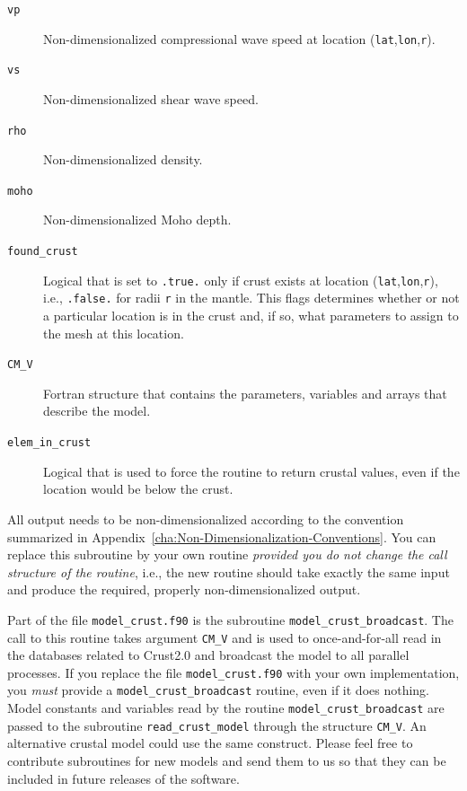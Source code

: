 \documentclass[oneside,english]{book}
\begin{document}
\begin{description}
\item [{\texttt{vp}}] Non-dimensionalized compressional wave speed at location
(\texttt{lat},\texttt{lon},\texttt{r}).
\item [{\texttt{vs}}] Non-dimensionalized shear wave speed.
\item [{\texttt{rho}}] Non-dimensionalized density.
\item [{\texttt{moho}}] Non-dimensionalized Moho depth.
\item [{\texttt{found\_crust}}] Logical that is set to \texttt{.true.}
only if crust exists at location (\texttt{lat},\texttt{lon},\texttt{r}),
i.e., \texttt{.false.} for radii \texttt{r} in the mantle. This flags
determines whether or not a particular location is in the crust and,
if so, what parameters to assign to the mesh at this location.
\item [{\texttt{CM\_V}}] Fortran structure that contains the parameters,
variables and arrays that describe the model.
\item [{\texttt{elem\_in\_crust}}] Logical that is used to force the
routine to return crustal values, even if the location would
be below the crust.
\end{description}
All output needs to be non-dimensionalized according to the convention
summarized in Appendix~\ref{cha:Non-Dimensionalization-Conventions}.
You can replace this subroutine by your own routine \textit{provided
you do not change the call structure of the routine}, i.e., the new
routine should take exactly the same input and produce the required,
properly non-dimensionalized output.

Part of the file \texttt{model\_crust.f90} is the subroutine \texttt{model\_crust\_broadcast}.
The call to this routine takes argument \texttt{CM\_V} and is used
to once-and-for-all read in the databases related to Crust2.0 and
broadcast the model to all parallel processes. If
you replace the file \texttt{model\_crust.f90} with your own implementation,
you \textit{must} provide a \texttt{model\_crust\_broadcast} routine,
even if it does nothing. Model constants and variables read by the
routine \texttt{model\_crust\_broadcast} are passed to the subroutine
\texttt{read\_crust\_model} through the structure \texttt{CM\_V}.
An alternative crustal model could use the same construct. Please
feel free to contribute subroutines for new models and send them to
us so that they can be included in future releases of the software.
\end{document}
